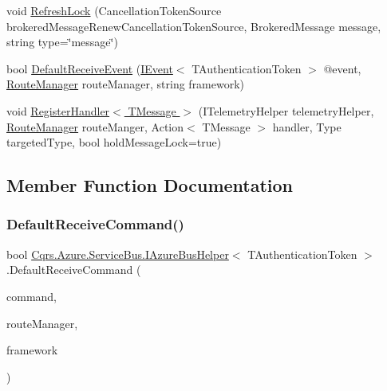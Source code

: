 \begin{DoxyCompactItemize}
void \hyperlink{interfaceCqrs_1_1Azure_1_1ServiceBus_1_1IAzureBusHelper_a51988703dad9dc41c834e620e4e6e31a}{Refresh\+Lock} (Cancellation\+Token\+Source brokered\+Message\+Renew\+Cancellation\+Token\+Source, Brokered\+Message message, string type=\char`\"{}message\char`\"{})
\item 
bool \hyperlink{interfaceCqrs_1_1Azure_1_1ServiceBus_1_1IAzureBusHelper_a29758e82b2fd6c7e3ed6b19547887db9}{Default\+Receive\+Event} (\hyperlink{interfaceCqrs_1_1Events_1_1IEvent}{I\+Event}$<$ T\+Authentication\+Token $>$ @event, \hyperlink{classCqrs_1_1Bus_1_1RouteManager}{Route\+Manager} route\+Manager, string framework)
\item 
void \hyperlink{interfaceCqrs_1_1Azure_1_1ServiceBus_1_1IAzureBusHelper_a1fe0ff74b4e5cce3d0b5a81dbaa273e0}{Register\+Handler$<$ T\+Message $>$} (I\+Telemetry\+Helper telemetry\+Helper, \hyperlink{classCqrs_1_1Bus_1_1RouteManager}{Route\+Manager} route\+Manger, Action$<$ T\+Message $>$ handler, Type targeted\+Type, bool hold\+Message\+Lock=true)
\end{DoxyCompactItemize}


\subsection{Member Function Documentation}
\mbox{\label{interfaceCqrs_1_1Azure_1_1ServiceBus_1_1IAzureBusHelper_a3c632e92e0e38110f9e7721fb31700d1}} 
\subsubsection{\texorpdfstring{Default\+Receive\+Command()}{DefaultReceiveCommand()}}
{\footnotesize\ttfamily bool \hyperlink{interfaceCqrs_1_1Azure_1_1ServiceBus_1_1IAzureBusHelper}{Cqrs.\+Azure.\+Service\+Bus.\+I\+Azure\+Bus\+Helper}$<$ T\+Authentication\+Token $>$.Default\+Receive\+Command (\begin{DoxyParamCaption}\item[{\hyperlink{interfaceCqrs_1_1Commands_1_1ICommand}{I\+Command}$<$ T\+Authentication\+Token $>$}]{command,  }\item[{\hyperlink{classCqrs_1_1Bus_1_1RouteManager}{Route\+Manager}}]{route\+Manager,  }\item[{string}]{framework }\end{DoxyParamCaption})}

